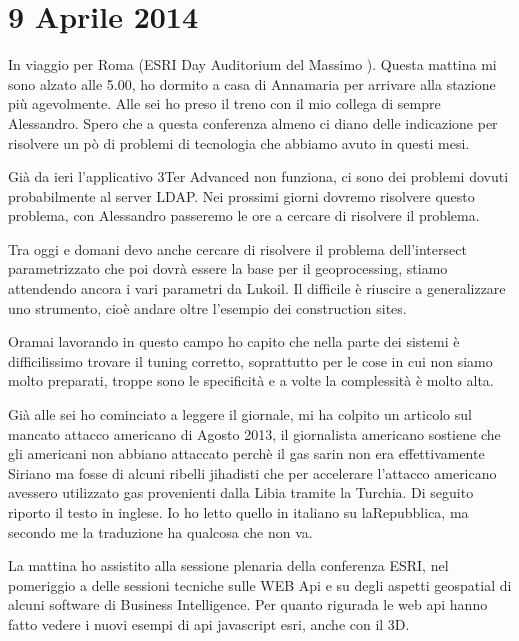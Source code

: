 \section{9 Aprile 2014}
In viaggio per Roma (ESRI Day Auditorium del Massimo ). Questa mattina
mi sono alzato alle 5.00, ho dormito a casa di Annamaria per arrivare
alla stazione più agevolmente. Alle sei ho preso il treno con il mio
collega di sempre Alessandro. Spero che a questa conferenza almeno
ci diano delle indicazione per risolvere un pò di problemi di tecnologia
che abbiamo avuto in questi mesi.

Già da ieri l'applicativo 3Ter Advanced non funziona, ci sono dei
problemi dovuti probabilmente al server LDAP. Nei prossimi giorni
dovremo risolvere questo problema, con Alessandro passeremo le ore
a cercare di risolvere il problema.

Tra oggi e domani devo anche cercare di risolvere il problema dell'intersect
parametrizzato che poi dovrà essere la base per il geoprocessing,
stiamo attendendo ancora i vari parametri da Lukoil. Il difficile
è riuscire a generalizzare uno strumento, cioè andare oltre l'esempio
dei construction sites.

Oramai lavorando in questo campo ho capito che nella parte dei sistemi
è difficilissimo trovare il tuning corretto, soprattutto per le cose
in cui non siamo molto preparati, troppe sono le specificità e a volte
la complessità è molto alta.

Già alle sei ho cominciato a leggere il giornale, mi ha colpito un
articolo sul mancato attacco americano di Agosto 2013, il giornalista
americano sostiene che gli americani non abbiano attaccato perchè
il gas sarin non era effettivamente Siriano ma fosse di alcuni ribelli
jihadisti che per accelerare l'attacco americano avessero utilizzato
gas provenienti dalla Libia tramite la Turchia. Di seguito riporto
il testo in inglese. Io ho letto quello in italiano su laRepubblica,
ma secondo me la traduzione ha qualcosa che non va.

La mattina ho assistito alla sessione plenaria della conferenza ESRI,
nel pomeriggio a delle sessioni tecniche sulle WEB Api e su degli
aspetti geospatial di alcuni software di Business Intelligence. Per
quanto rigurada le web api hanno fatto vedere i nuovi esempi di api
javascript esri, anche con il 3D.

